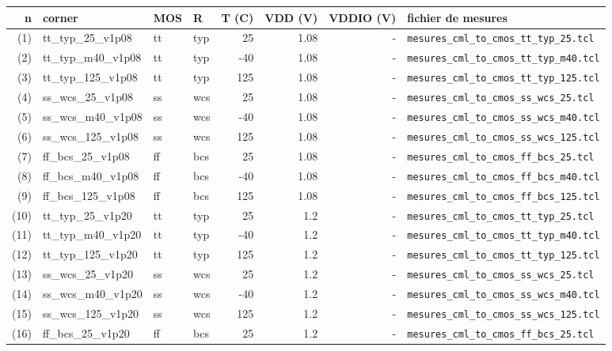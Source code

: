 \documentclass[a4paper,10pt,landscape]{article}
\begin{document}
\begin{longtable}{rlllrrrl}\toprule
n & corner & MOS & R & T (C) & VDD (V) & VDDIO (V) & fichier de mesures \\ \midrule\endhead
(1) & tt\_typ\_25\_v1p08 & tt & typ & 25 & 1.08 & - & {\small\texttt{mesures\_cml\_to\_cmos\_tt\_typ\_25.tcl}} \\
(2) & tt\_typ\_m40\_v1p08 & tt & typ & -40 & 1.08 & - & {\small\texttt{mesures\_cml\_to\_cmos\_tt\_typ\_m40.tcl}} \\
(3) & tt\_typ\_125\_v1p08 & tt & typ & 125 & 1.08 & - & {\small\texttt{mesures\_cml\_to\_cmos\_tt\_typ\_125.tcl}} \\
(4) & ss\_wcs\_25\_v1p08 & ss & wcs & 25 & 1.08 & - & {\small\texttt{mesures\_cml\_to\_cmos\_ss\_wcs\_25.tcl}} \\
(5) & ss\_wcs\_m40\_v1p08 & ss & wcs & -40 & 1.08 & - & {\small\texttt{mesures\_cml\_to\_cmos\_ss\_wcs\_m40.tcl}} \\
(6) & ss\_wcs\_125\_v1p08 & ss & wcs & 125 & 1.08 & - & {\small\texttt{mesures\_cml\_to\_cmos\_ss\_wcs\_125.tcl}} \\
(7) & ff\_bcs\_25\_v1p08 & ff & bcs & 25 & 1.08 & - & {\small\texttt{mesures\_cml\_to\_cmos\_ff\_bcs\_25.tcl}} \\
(8) & ff\_bcs\_m40\_v1p08 & ff & bcs & -40 & 1.08 & - & {\small\texttt{mesures\_cml\_to\_cmos\_ff\_bcs\_m40.tcl}} \\
(9) & ff\_bcs\_125\_v1p08 & ff & bcs & 125 & 1.08 & - & {\small\texttt{mesures\_cml\_to\_cmos\_ff\_bcs\_125.tcl}} \\
(10) & tt\_typ\_25\_v1p20 & tt & typ & 25 & 1.2 & - & {\small\texttt{mesures\_cml\_to\_cmos\_tt\_typ\_25.tcl}} \\
(11) & tt\_typ\_m40\_v1p20 & tt & typ & -40 & 1.2 & - & {\small\texttt{mesures\_cml\_to\_cmos\_tt\_typ\_m40.tcl}} \\
(12) & tt\_typ\_125\_v1p20 & tt & typ & 125 & 1.2 & - & {\small\texttt{mesures\_cml\_to\_cmos\_tt\_typ\_125.tcl}} \\
(13) & ss\_wcs\_25\_v1p20 & ss & wcs & 25 & 1.2 & - & {\small\texttt{mesures\_cml\_to\_cmos\_ss\_wcs\_25.tcl}} \\
(14) & ss\_wcs\_m40\_v1p20 & ss & wcs & -40 & 1.2 & - & {\small\texttt{mesures\_cml\_to\_cmos\_ss\_wcs\_m40.tcl}} \\
(15) & ss\_wcs\_125\_v1p20 & ss & wcs & 125 & 1.2 & - & {\small\texttt{mesures\_cml\_to\_cmos\_ss\_wcs\_125.tcl}} \\
(16) & ff\_bcs\_25\_v1p20 & ff & bcs & 25 & 1.2 & - & {\small\texttt{mesures\_cml\_to\_cmos\_ff\_bcs\_25.tcl}} \\

\end{longtable}
\end{document}
